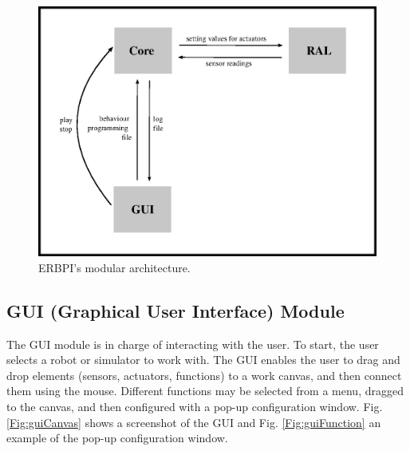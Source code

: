 
\begin{figure}
 \centering
 \includegraphics[scale=0.7]{images/arq_eng.eps}
 \caption{ERBPI's modular architecture.}
 \label{Fig:arquitectura}
\end{figure}

\subsection{GUI (Graphical User Interface) Module}

The GUI module is in charge of interacting with the user. To start, the user selects a robot or simulator to work with. The GUI enables the user to drag and drop elements (sensors, actuators, functions) to a work canvas, and then connect them using the mouse. Different functions may be selected from a menu, dragged to the canvas, and then configured with a pop-up configuration window. Fig. \ref{Fig:guiCanvas} shows a screenshot of the GUI and Fig. \ref{Fig:guiFunction} an example of the pop-up configuration window. 


